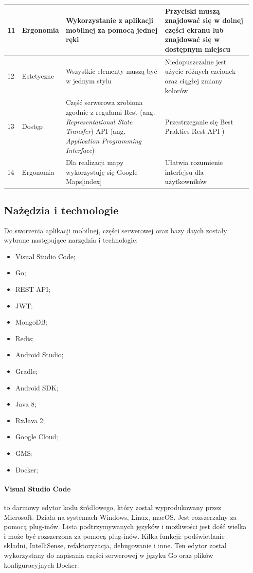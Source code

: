 \begin{table}[htb]
\begin{tabular}{| m{0.5cm} | m{3cm} | m{5.75cm} | m{5.75cm} |}
    \hline
    11 & Ergonomia & Wykorzystanie z aplikacji mobilnej za pomocą jednej ręki & Przyciski muszą znajdować się w dolnej części ekranu lub znajdować się w dostępnym miejscu \\
    \hline
    12 & Estetyczne & Wszystkie elementy muszą być w jednym stylu & Niedopuszczalne jest użycie różnych czcionek oraz ciągłej zmiany kolorów \\
    \hline
    13 & Dostęp & Część serwerowa zrobiona zgodnie z regułami Rest (ang. \textit{Representational State Transfer}) API (ang. \textit{Application Programming Interface}) & Przestrzeganie się Best Prakties Rest API \cite{rest_api_best}) \\
    \hline
    14 & Ergonomia & Dla realizacji mapy wykorzystuję się Google Maps[index] & Ułatwia rozumienie interfejsu dla użytkowników \\
    \hline
\end{tabular}
\end{table}
\newpage
\subsection{Nażędzia i technologie}
Do sworzenia aplikacji mobilnej, części serwerowej oraz bazy daych zostały wybrane następujące narzędzia i technologie:
\begin{itemize}
    \item Visual Studio Code;
    \item Go;
    \item REST API;
    \item JWT;
    \item MongoDB;
    \item Redis;
    \item Android Studio;
    \item Gradle;
    \item Android SDK;
    \item Java 8;
    \item RxJava 2;
    \item Google Cloud;
    \item GMS;
    \item Docker;
\end{itemize}

\paragraph{Visual Studio Code} \cite{vscode} to darmowy edytor kodu źródłowego, który został wyprodukowany przez Microsoft. Działa na systemach Windows, Linux, macOS. Jest rozszerzalny za pomocą plug-inów.
Lista podtrzymywanych języków i możliwości jest dość wielka i może być rozszerzona za pomocą plug-inów. Kilka funkcji: podświetlanie składni, IntelliSense, refaktoryzacja, debugowanie i inne.
Ten edytor został wykorzystany do napisania części serwerowej w języku Go oraz plików konfiguracyjnych Docker.


